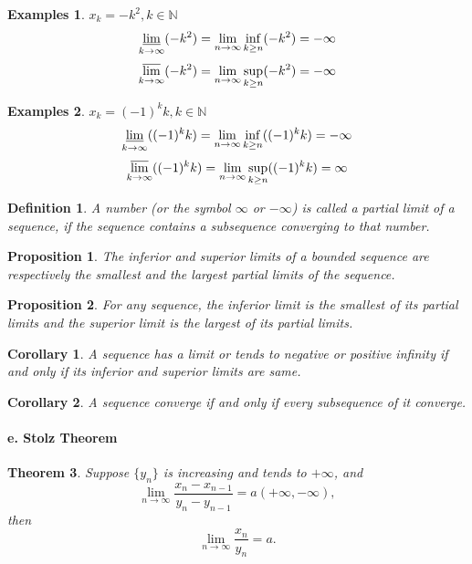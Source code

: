 \documentclass[a4paper,12pt]{article} %
\newtheorem{definition}{Definition}[section]
\newtheorem{theorem}{Theorem}[section]
\newtheorem{proposition}{Proposition}[section]
\newtheorem{corollary}[theorem]{Corollary}
\newtheorem{example}{Examples}
\begin{document}
\begin{example}
    $\displaystyle x_k = -k^2,k \in \mathbb{N}$
   \[ \varliminf_{k \to \infty} (-k^2) = \lim_{n \to \infty} 
    \inf_{k \ge n} (-k^2)= -\infty\]
    \[ \varlimsup_{k \to \infty} (-k^2) = \lim_{n \to \infty} 
    \sup_{k \ge n} (-k^2) = -\infty\]
\end{example}

\begin{example}
    $x_k = (-1)^kk, k \in \mathbb{N}$
    \[ \varliminf_{k \to \infty} ((-1)^kk) = \lim_{n \to \infty} 
    \inf_{k \ge n} ((-1)^kk)= -\infty\]
    \[ \varlimsup_{k \to \infty} ((-1)^kk) = \lim_{n \to \infty} 
    \sup_{k \ge n} ((-1)^kk) = \infty\]
\end{example}

\begin{definition}
    A number (or the symbol $\infty$ or $-\infty$) is called a partial limit 
    of a sequence, if the sequence contains a subsequence converging 
    to that number.
\end{definition}

\begin{proposition}
    The inferior and superior limits of a bounded sequence 
    are respectively the smallest and the largest partial 
    limits of the sequence.
\end{proposition}

\begin{proposition}
    For any sequence, the inferior limit is the smallest of its 
    partial limits and the superior limit is the largest of its 
    partial limits.
\end{proposition}

\begin{corollary}
    A sequence has a limit or tends to negative or positive infinity 
    if and only if its inferior and superior limits are same.
\end{corollary}

\begin{corollary}
    A sequence converge if and only if every subsequence of it converge.
\end{corollary}

\paragraph{{\rm \textbf{e. Stolz Theorem}}}

\begin{theorem}
    Suppose $\{y_n\}$ is increasing and tends to $+\infty$, and 
    \[\lim_{n \to \infty} \frac{x_n - x_{n-1}}{y_n - y_{n-1}} = a (+\infty, -\infty),\]
    then 
    \[\lim_{n \to \infty} \frac{x_n}{y_n} = a.\]
\end{theorem}
\end{document}
